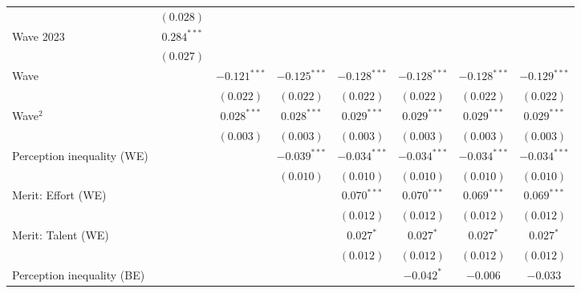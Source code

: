 \documentclass[
  12pt,
]{article}
\begin{document}
\begin{table}
\begin{center}
{\begin{tabular}{l c c c c c c c}
                                   & $(0.028)$      &                &                &                &                &                &                \\
\quad Wave 2023                    & $0.284^{***}$  &                &                &                &                &                &                \\
                                   & $(0.027)$      &                &                &                &                &                &                \\
Wave                               &                & $-0.121^{***}$ & $-0.125^{***}$ & $-0.128^{***}$ & $-0.128^{***}$ & $-0.128^{***}$ & $-0.129^{***}$ \\
                                   &                & $(0.022)$      & $(0.022)$      & $(0.022)$      & $(0.022)$      & $(0.022)$      & $(0.022)$      \\
Wave$^2$                           &                & $0.028^{***}$  & $0.028^{***}$  & $0.029^{***}$  & $0.029^{***}$  & $0.029^{***}$  & $0.029^{***}$  \\
                                   &                & $(0.003)$      & $(0.003)$      & $(0.003)$      & $(0.003)$      & $(0.003)$      & $(0.003)$      \\
Perception inequality (WE)         &                &                & $-0.039^{***}$ & $-0.034^{***}$ & $-0.034^{***}$ & $-0.034^{***}$ & $-0.034^{***}$ \\
                                   &                &                & $(0.010)$      & $(0.010)$      & $(0.010)$      & $(0.010)$      & $(0.010)$      \\
Merit: Effort (WE)                 &                &                &                & $0.070^{***}$  & $0.070^{***}$  & $0.069^{***}$  & $0.069^{***}$  \\
                                   &                &                &                & $(0.012)$      & $(0.012)$      & $(0.012)$      & $(0.012)$      \\
Merit: Talent (WE)                 &                &                &                & $0.027^{*}$    & $0.027^{*}$    & $0.027^{*}$    & $0.027^{*}$    \\
                                   &                &                &                & $(0.012)$      & $(0.012)$      & $(0.012)$      & $(0.012)$      \\
Perception inequality (BE)         &                &                &                &                & $-0.042^{*}$   & $-0.006$       & $-0.033$       \\

\end{tabular}}
\end{center}
\end{table}
\end{document}
